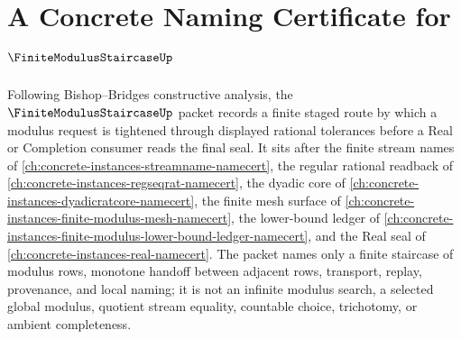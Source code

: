 \chapter{A Concrete Naming Certificate for $\FiniteModulusStaircaseUp$}
\label{ch:concrete-instances-finite-modulus-staircase-namecert}

Following Bishop--Bridges constructive analysis, the $\FiniteModulusStaircaseUp$ packet records a finite staged route by which a modulus request is tightened through displayed rational tolerances before a Real or Completion consumer reads the final seal. It sits after the finite stream names of \autoref{ch:concrete-instances-streamname-namecert}, the regular rational readback of \autoref{ch:concrete-instances-regseqrat-namecert}, the dyadic core of \autoref{ch:concrete-instances-dyadicratcore-namecert}, the finite mesh surface of \autoref{ch:concrete-instances-finite-modulus-mesh-namecert}, the lower-bound ledger of \autoref{ch:concrete-instances-finite-modulus-lower-bound-ledger-namecert}, and the Real seal of \autoref{ch:concrete-instances-real-namecert}. The packet names only a finite staircase of modulus rows, monotone handoff between adjacent rows, transport, replay, provenance, and local naming; it is not an infinite modulus search, a selected global modulus, quotient stream equality, countable choice, trichotomy, or ambient completeness.

